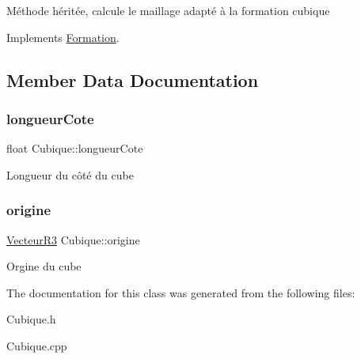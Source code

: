 Méthode héritée, calcule le maillage adapté à la formation cubique 

Implements \mbox{\hyperlink{class_formation_ad1044228c0a1a4ee585ffe7f615c06ea}{Formation}}.



\subsection{Member Data Documentation}
\mbox{\label{class_cubique_a2d8ca11e6bf2f6b73aad6ca1f595990e}} 
\subsubsection{\texorpdfstring{longueur\+Cote}{longueurCote}}
{\footnotesize\ttfamily float Cubique\+::longueur\+Cote\hspace{0.3cm}{\ttfamily [protected]}}

Longueur du côté du cube \mbox{\label{class_cubique_ab9d0ac86eeba76c72022bd84c401bb59}} 
\subsubsection{\texorpdfstring{origine}{origine}}
{\footnotesize\ttfamily \mbox{\hyperlink{class_vecteur_r3}{Vecteur\+R3}} Cubique\+::origine\hspace{0.3cm}{\ttfamily [protected]}}

Orgine du cube 

The documentation for this class was generated from the following files\+:\begin{DoxyCompactItemize}
\item 
Cubique.\+h\item 
Cubique.\+cpp\end{DoxyCompactItemize}
